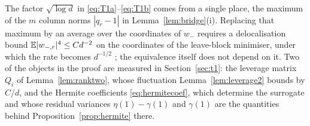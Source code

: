 \begin{remark}\label{rem:T1}
The factor $\sqrt{\log d}$ in \eqref{eq:T1a}--\eqref{eq:T1b} comes from a single place, the maximum of the
$m$ column norms $|q_r-1|$ in Lemma~\ref{lem:bridge}(i). Replacing that maximum by an average over the
coordinates of $w_-$ requires a delocalisation bound $\mathbb{E}|w_{-,r}|^4\le Cd^{-2}$ on the coordinates of the
leave-block minimiser, under which the rate becomes $d^{-1/2}$ \cite{PN24}; the equivalence itself does not
depend on it. Two of the objects in the proof are measured in Section~\ref{sec:t1}: the leverage matrix
$Q_i$ of Lemma~\ref{lem:ranktwo}, whose fluctuation Lemma~\ref{lem:leverage2} bounds by $C/d$, and the
Hermite coefficients \eqref{eq:hermitecoef}, which determine the surrogate and whose residual variances
$\eta(1)-\gamma(1)$ and $\gamma(1)$ are the quantities behind Proposition~\ref{prop:hermite} there.
\end{remark}
